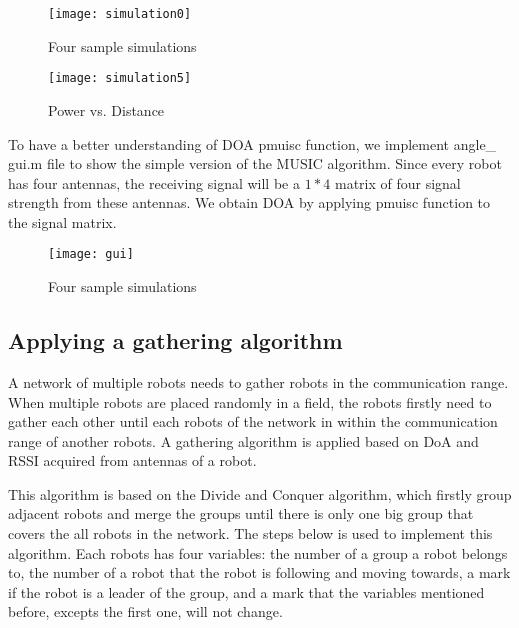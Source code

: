 \begin{figure}[ht]
	\centering
	\texttt{[image: simulation0]}
	\caption{Four sample simulations}
	\end{figure}
	
\begin{figure}[ht]
	\centering
	\texttt{[image: simulation5]}
	\caption{Power vs. Distance}
	\end{figure}
	
\par
	To have a better understanding of DOA pmuisc function, we implement angle\_ gui.m file to show the simple version of the MUSIC algorithm. Since every robot has four antennas, the receiving signal will be a $1 * 4$ matrix of four signal strength from these antennas. We obtain DOA by applying pmuisc function to the signal matrix.\\
    \begin{figure}[ht]
	\centering
	\texttt{[image: gui]}
	\caption{Four sample simulations}
	\end{figure}


\subsection{Applying a gathering algorithm}
\par
A network of multiple robots needs to gather robots in the communication range. When multiple robots are placed randomly in a field, the robots firstly need to gather each other until each robots of the network in within the communication range of another robots. A gathering algorithm is applied based on DoA and RSSI acquired from antennas of a robot.
\par
This algorithm is based on the Divide and Conquer algorithm, which firstly group adjacent robots and merge the groups until there is only one big group that covers the all robots in the network. The steps below is used to implement this algorithm. Each robots has four variables: the number of a group a robot belongs to, the number of a robot that the robot is following and moving towards, a mark if the robot is a leader of the group, and a mark that the variables mentioned before, excepts the first one, will not change.


